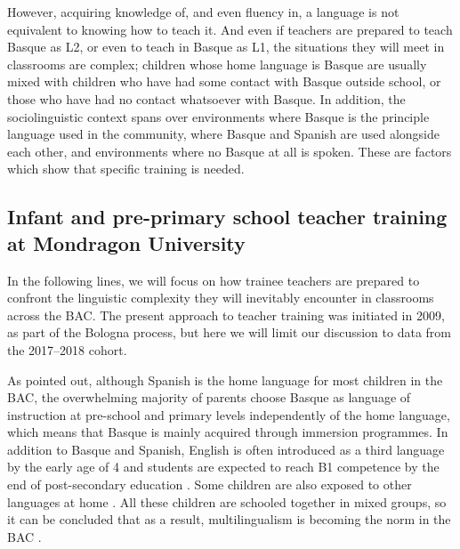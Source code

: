 \documentclass[output=paper]{../langscibook}
\begin{document}
However, acquiring knowledge of, and even fluency in, a language is not equivalent to knowing how to teach it. And even if teachers are prepared to teach Basque as L2, or even to teach in Basque as L1, the situations they will meet in classrooms are complex; children whose home language is Basque are usually mixed with children who have had some contact with Basque outside school, or those who have had no contact whatsoever with Basque. In addition, the sociolinguistic context spans over environments where Basque is the principle language used in the community, where Basque and Spanish are used alongside each other, and environments where no Basque at all is spoken. These are factors which show that specific training is needed.


\subsection{Infant and pre-primary school teacher training at Mondragon University}


In the following lines, we will focus on how trainee teachers are prepared to confront the linguistic complexity they will inevitably encounter in classrooms across the BAC. The present approach to teacher training was initiated in 2009, as part of the Bologna process, but here we will limit our discussion to data from the 2017--2018 cohort.  

As pointed out, although Spanish is the home language for most children in the BAC, the overwhelming majority of parents choose Basque as language of instruction at pre-school and primary levels independently of the home language, which means that Basque is mainly acquired through immersion programmes. In addition to Basque and Spanish, English is often introduced as a third language by the early age of 4 and students are expected to reach B1 competence by the end of post-secondary education \citep{Lasagabaster2000}. Some children are also exposed to other languages at home \citep{Barnes2006}. All these children are schooled together in mixed groups, so it can be concluded that as a result, multilingualism is becoming the norm in the BAC \citep{Cenoz2009}.
\end{document}
